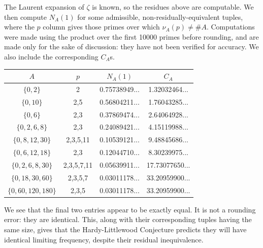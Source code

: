 \documentclass[11pt, leqno]{article}
\newtheorem{definition}[theorem]{Definition}
\begin{document}
The Laurent expansion of $\zeta$ is known, so the residues above are computable.
We then compute $N_A(1)$ for some 
admissible, non-residually-equivalent tuples,
where the $p$ column gives those primes over which $\nu_A(p)\not=\#A$.
Computations were made using the product over the first 
10000 primes before rounding, and are made only for the sake of discussion:
they have not been verified for accuracy.
We also include the corresponding $C_A$s.

\begin{center}
\begin{tabular}{ c | c | c | c }
    $A$ & $p$ & $N_A(1)$ & $C_A$ \\ 
    \hline
    $\{0,2\}$         & 2          & 0.75738949... &  1.32032464... \\
    $\{0,10\}$        & 2,5        & 0.56804211... &  1.76043285... \\
    $\{0,6\}$         & 2,3        & 0.37869474... &  2.64064928... \\
    $\{0,2,6,8\}$     & 2,3        & 0.24089421... &  4.15119988... \\
    $\{0,8,12,30\}$   & 2,3,5,11   & 0.10539121... &  9.48845686... \\
    $\{0,6,12,18\}$   & 2,3        & 0.12044710... &  8.30239975... \\
    $\{0,2,6,8,30\}$  & 2,3,5,7,11 & 0.05639911... & 17.73077650... \\
    $\{0,18,30,60\}$  & 2,3,5,7    & 0.03011178... & 33.20959900... \\
    $\{0,60,120,180\}$& 2,3,5      & 0.03011178... & 33.20959900... \\
\end{tabular}
\end{center}

We see that the final two entries appear to be exactly
equal. It is not a rounding error: they are identical.
This, along with their corresponding tuples having the same size,
gives that the Hardy-Littlewood Conjecture predicts they
will have identical limiting frequency, despite their residual
inequivalence.

\end{document}
